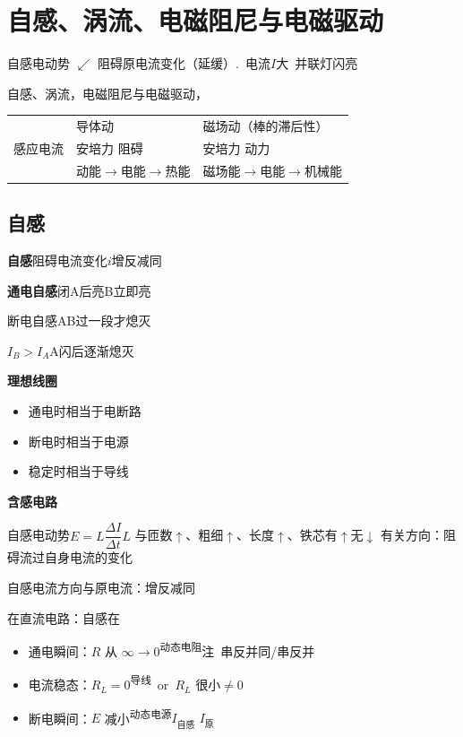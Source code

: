\section{自感、涡流、电磁阻尼与电磁驱动}
自感电动势 $\swarrow$ 阻碍原电流变化\quad （延缓）.\ 电流$I$大\ 并联灯闪亮

自感、涡流，电磁阻尼与电磁驱动，

\begin{tabular}{@{}lll@{}}
 & 导体动 & 磁场动（棒的滞后性）\\
感应电流 & 安培力 阻碍 & 安培力 动力\\
 & 动能$\to$电能$\to$热能 & 磁场能$\to$电能$\to$机械能
\end{tabular}

\subsection{自感}
\textbf{自感}\quad {}阻碍电流变化\quad $i$增反减同



\textbf{通电自感}\quad 闭A后亮\quad B立即亮

断电自感\quad AB过一段才熄灭

$I_B>I_A$\quad A闪后逐渐熄灭

\textbf{理想线圈}
\begin{itemize}
\item 通电时相当于电断路 %
\item 断电时相当于电源
\item 稳定时相当于导线
\end{itemize}

\textbf{含感电路}

\noindent 自感电动势\quad $E=L\dfrac{\Delta I}{\Delta t}$\quad $L$ 与匝数$\uparrow$、粗细$\uparrow$、长度$\uparrow$、铁芯有$\uparrow$无$\downarrow$ 有关\quad 方向：阻碍流过自身电流的变化%

\noindent\hspace*{4em}自感电流方向与原电流：增反减同

\noindent 在直流电路：自感在
\begin{itemize}
\item 通电瞬间：$R$ 从 $\infty\to0$\textsuperscript{动态电阻}\quad 注\ 串反并同/串反并
\item 电流稳态：$R_L=0$\textsuperscript{导线}\ or\ $R_L$ 很小$\neq0$
\item 断电瞬间：$E$ 减小\textsuperscript{动态电源}\quad $I_{\text{自感}}$ \unclear{$\le$} $I_{\text{原}}$
\end{itemize}

